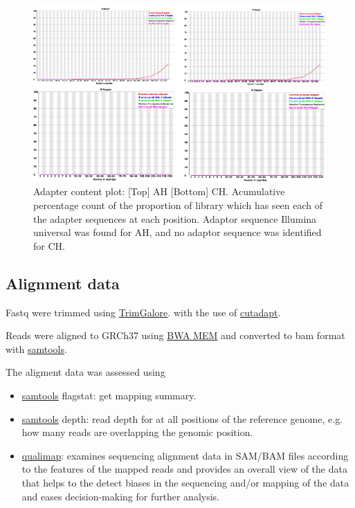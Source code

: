 \documentclass{article}
\begin{document}
\begin{figure}[h] \hspace*{0cm} 
\begin{center}
    \includegraphics[scale=0.45]{fastqc/p6}
	\caption{Adapter content plot:  [Top] AH [Bottom] CH. Acumulative percentage count of the proportion of library which has seen each of the adapter sequences at each position. Adaptor sequence Illumina universal was found for AH, and no adaptor sequence was identified for CH. }
	\label{fig:p6}
\end{center}
\end{figure}

\clearpage

\subsection{Alignment data}
\label{align_data}
Fastq were trimmed using
\href{https://www.bioinformatics.babraham.ac.uk/projects/trim_galore/}{TrimGalore}.  
with the use of 
\href{ https://github.com/marcelm/cutadapt/}{cutadapt}.

Reads were aligned to GRCh37 using 
\href{http://bio-bwa.sourceforge.net}{BWA MEM} and converted to bam format with 
\href{http://www.htslib.org}{samtools}.

The aligment data was assessed using 
\begin{itemize}
\item \href{http://www.htslib.org}{samtools} flagstat: get mapping summary.
\item \href{http://www.htslib.org}{samtools} depth: read depth for at all positions of the reference genome, e.g. how many reads are overlapping the genomic position.
\item \href{http://qualimap.conesalab.org}{qualimap}: examines sequencing alignment data in SAM/BAM files according to the features of the mapped reads and provides an overall view of the data that helps to the detect biases in the sequencing and/or mapping of the data and eases decision-making for further analysis.
\end{itemize}
\end{document}
